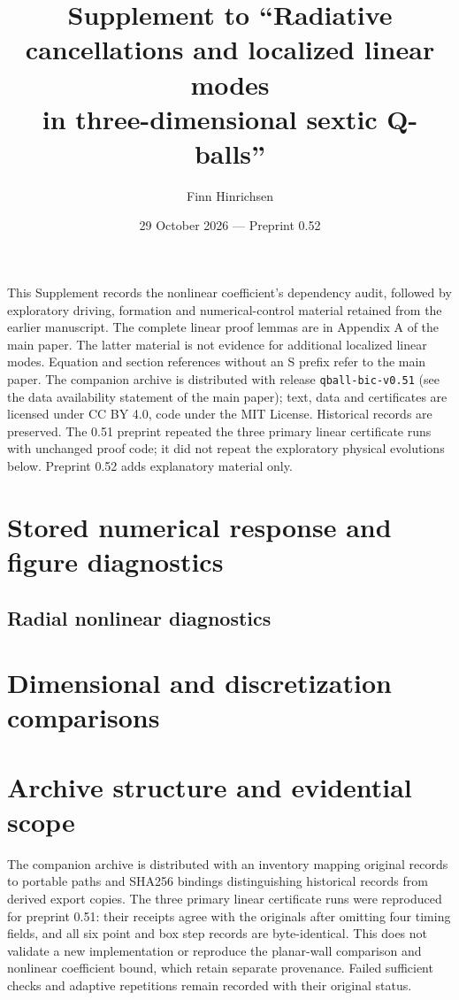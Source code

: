 \documentclass[a4paper,11pt]{article}
\title{Supplement to ``Radiative cancellations and localized linear modes\\in three-dimensional sextic Q-balls''}
\author{Finn Hinrichsen}
\date{29 October 2026 --- Preprint 0.52}
\begin{document}
\maketitle
This Supplement records the nonlinear coefficient's dependency audit,
followed by exploratory driving, formation and numerical-control
material retained from the earlier manuscript. The complete linear
proof lemmas are in Appendix A of the main paper.
The latter material is not evidence for additional localized linear modes.
Equation and section references without an S prefix refer to the main paper.
The companion archive is distributed with release \texttt{qball-bic-v0.51}
(see the data availability statement of the main paper); text, data and
certificates are licensed under CC BY 4.0, code under the MIT License.
Historical records are preserved. The 0.51 preprint
repeated the three primary linear certificate runs with unchanged proof
code; it did not repeat the exploratory physical evolutions below.
Preprint 0.52 adds explanatory material only.
\tableofcontents

\section{Stored numerical response and figure diagnostics}

\subsection{Radial nonlinear diagnostics}\label{supp:c0-evidence}


\section{Dimensional and discretization comparisons}



\clearpage

\clearpage

\clearpage

\section{Archive structure and evidential scope}\label{app:provenance}
The companion archive is distributed with an inventory mapping
original records to portable paths and SHA256 bindings distinguishing
historical records from derived export copies. The three primary linear
certificate runs were reproduced for preprint 0.51: their receipts agree
with the originals after omitting four timing fields, and all six point
and box step records are byte-identical. This does not validate a new
implementation or reproduce the planar-wall comparison and nonlinear
coefficient bound, which retain separate provenance. Failed sufficient
checks and adaptive repetitions remain recorded with their original status.
\end{document}
